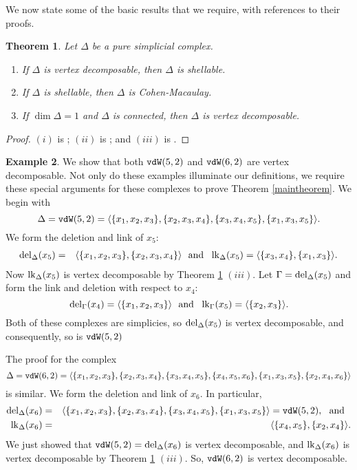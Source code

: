 \documentclass[12pt]{amsart}
\numberwithin{equation}{section}
\newtheorem{theorem}{Theorem}[section]
\theoremstyle{definition}
\newtheorem{example}[theorem]{Example}
\begin{document}
We now state some of the basic results that we require, with references
to their proofs.

\begin{theorem}\label{vdprop}
Let $\Delta$ be a pure simplicial complex.
\begin{enumerate}
\item[$(i)$] If $\Delta$ is vertex decomposable, then $\Delta$ is shellable.
\item[$(ii)$] If $\Delta$ is shellable, then $\Delta$ is Cohen-Macaulay.
\item[$(iii)$] If $\dim \Delta =1$ and $\Delta$ is connected,
then $\Delta$ is vertex decomposable.
\end{enumerate}
\end{theorem}

\begin{proof} $(i)$ is \cite[Corollary 2.9]{PB}; $(ii)$ is 
\cite[Theorem 5.3.18]{V}; and $(iii)$ is \cite[Theorem 3.1.2]{PB}.
\end{proof}

\begin{example}\label{specialcases}
We show that
both ${\tt vdW}(5,2)$ and ${\tt vdW}(6,2)$ are vertex decomposable.
Not only do these examples illuminate our definitions,
we require these special arguments for these complexes to prove Theorem 
\ref{maintheorem}.
We begin with 
\[\Delta = {\tt vdW}(5,2) = 
\langle \{x_1,x_2,x_3\},\{x_2,x_3,x_4\},\{x_3,x_4,x_5\},\{x_1,x_3,x_5\} 
\rangle. \]
We form the deletion and link of $x_5$:
\begin{eqnarray*}
\operatorname{del}_\Delta(x_5) &=&
 \langle \{x_1,x_2,x_3\},\{x_2,x_3,x_4\} \rangle ~~\mbox{and}~~ \operatorname{lk}_\Delta(x_5) = \langle \{x_3,x_4\},\{x_1,x_3\}\rangle.
\end{eqnarray*}
Now  $\operatorname{lk}_\Delta(x_5)$ is vertex decomposable by Theorem \ref{vdprop} $(iii)$.
Let $\Gamma = \operatorname{del}_\Delta(x_5)$ and form the link and deletion
with respect to $x_4$:
\[\operatorname{del}_\Gamma(x_4) =
 \langle \{x_1,x_2,x_3\} \rangle ~~\mbox{and}~~ \operatorname{lk}_\Gamma(x_5) = 
\langle \{x_2,x_3 \} \rangle.\]
Both of these complexes are simplicies, so $\operatorname{del}_\Delta(x_5)$ is 
vertex decomposable, and consequently, so is ${\tt vdW}(5,2)$

The proof for the complex
\[\Delta = {\tt vdW}(6,2) = \langle \{x_1,x_2,x_3\},\{x_2,x_3,x_4\},\{x_3,x_4,x_5\},
\{x_4,x_5,x_6\},\{x_1,x_3,x_5\},\{x_2,x_4,x_6\} \rangle\]
is similar.  We form the deletion and link of $x_6$.  In particular,
\begin{eqnarray*}
\operatorname{del}_\Delta(x_6) &=&
 \langle \{x_1,x_2,x_3\},\{x_2,x_3,x_4\},\{x_3,x_4,x_5\},\{x_1,x_3,x_5\}  \rangle
= {\tt vdW}(5,2), ~~\mbox{and}~~ \\
\operatorname{lk}_\Delta(x_6)& =& \langle \{x_4,x_5\},\{x_2,x_4\}\rangle.
\end{eqnarray*}
We just showed that ${\tt vdW}(5,2) = \operatorname{del}_\Delta(x_6)$ 
is vertex decomposable, and  $\operatorname{lk}_\Delta(x_6)$ is vertex decomposable
by Theorem \ref{vdprop} $(iii)$.  So, ${\tt vdW}(6,2)$ is vertex decomposable.
\end{example}
\end{document}

